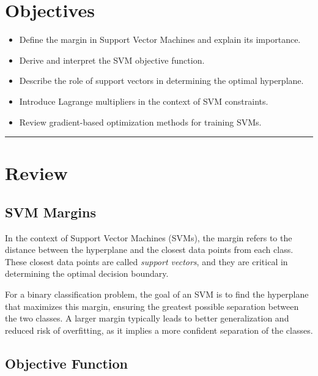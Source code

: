 \section*{Objectives}
\begin{itemize}
    \item Define the margin in Support Vector Machines and explain its importance.
    \item Derive and interpret the SVM objective function.
    \item Describe the role of support vectors in determining the optimal hyperplane.
    \item Introduce Lagrange multipliers in the context of SVM constraints.
    \item Review gradient-based optimization methods for training SVMs.
\end{itemize}


\rule[0.0051in]{\textwidth}{0.00025in}

\section{Review}
\subsection{SVM Margins}

In the context of Support Vector Machines (SVMs), the margin refers to the distance between the hyperplane and the closest data points from each class. These closest data points are called \textit{support vectors}, and they are critical in determining the optimal decision boundary.

For a binary classification problem, the goal of an SVM is to find the hyperplane that maximizes this margin, ensuring the greatest possible separation between the two classes. A larger margin typically leads to better generalization and reduced risk of overfitting, as it implies a more confident separation of the classes.

\subsection{Objective Function}

